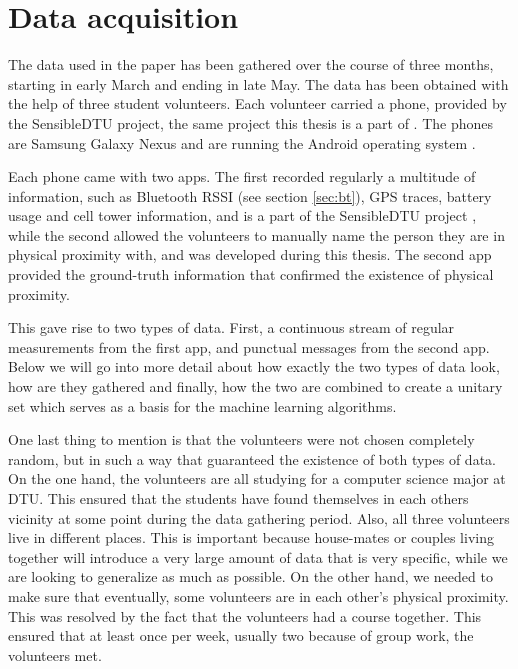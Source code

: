 \chapter{Data acquisition}

The data used in the paper has been gathered over the course of three months, starting in early March and ending in late May. The data has been obtained with the help of three student volunteers. Each volunteer carried a phone, provided by the SensibleDTU project, the same project this thesis is a part of \cite{sensibledtu, Stopczynski}. The phones are Samsung Galaxy Nexus \cite{nexus} and are running the Android operating system \cite{android}.

Each phone came with two apps. The first recorded regularly a multitude of information, such as Bluetooth RSSI (see section \ref{sec:bt}), GPS traces, battery usage and cell tower information, and is a part of the SensibleDTU project \cite{Stopczynski}, while the second allowed the volunteers to manually name the person they are in physical proximity with, and was developed during this thesis. The second app provided the ground-truth information that confirmed the existence of physical proximity.

This gave rise to two types of data. First, a continuous stream of regular measurements from the first app, and punctual messages from the second app. Below we will go into more detail about how exactly the two types of data look, how are they gathered and finally, how the two are combined to create a unitary set which serves as a basis for the machine learning algorithms.

One last thing to mention is that the volunteers were not chosen completely random, but in such a way that guaranteed the existence of both types of data. On the one hand, the volunteers are all studying for a computer science major at DTU. This ensured that the students have found themselves in each others vicinity at some point during the data gathering period. Also, all three volunteers live in different places. This is important because house-mates or couples living together will introduce a very large amount of data that is very specific, while we are looking to generalize as much as possible.
On the other hand, we needed to make sure that eventually, some volunteers are in each other's physical proximity. This was resolved by the fact that the volunteers had a course together. This ensured that at least once per week, usually two because of group work, the volunteers met.

